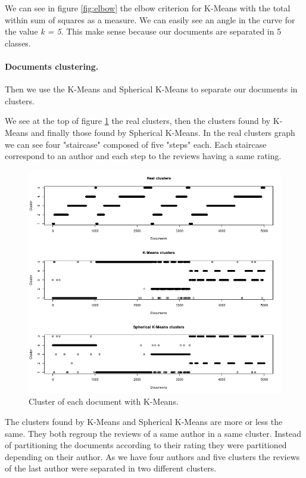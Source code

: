 \documentclass{article}
\begin{document}
We can see in figure \ref{fig:elbow} the elbow criterion for K-Means with the total within sum of squares as a measure. We can easily see an angle in the curve for the value \textit{k = 5}. This make sense because our documents are separated in 5 classes.

\paragraph{Documents clustering.}
Then we use the K-Means and Spherical K-Means to separate our documents in clusters.

We see at the top of figure \ref{fig:kmeans_skmeans} the real clusters, then the clusters found by K-Means and finally those found by Spherical K-Means. In the real clusters graph we can see four "staircase" composed of five "steps" each. Each staircase correspond to an author and each step to the reviews having a same rating.

\begin{figure}[H]
\centering
\includegraphics[width=\textwidth]{kmeans_and_skmeans.png}
\caption{Cluster of each document with K-Means.}
\label{fig:kmeans_skmeans}
\end{figure}

The clusters found by K-Means and Spherical K-Means are more or less the same. They both regroup the reviews of a same author in a same cluster. Instead of partitioning the documents according to their rating they were partitioned depending on their author. As we have four authors and five clusters the reviews of the last author were separated in two different clusters.
\end{document}
